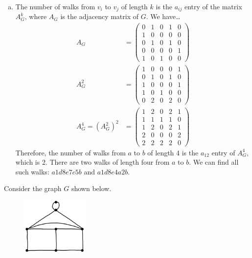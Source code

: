 \documentclass[11pt,letterpaper]{article}
\begin{document}
\begin{enumerate}[(a)]
\item The number of walks from $v_i$ to $v_j$ of length $k$ is the $a_{ij}$ entry of the matrix $A_G^k$, where $A_G$ is the adjacency matrix of $G$. We have\dots
	\[
	\begin{aligned}
	A_G&= 
	\begin{pmatrix}
	0 & 1 & 0 & 1 & 0 \\
	1 & 0 & 0 & 0 & 0 \\
	0 & 1 & 0 & 1 & 0 \\
	0 & 0 & 0 & 0 & 1 \\
	1 & 0 & 1 & 0 & 0 
	\end{pmatrix} \\[0.3cm]
	A_G^2&= 
	\begin{pmatrix}
	1 & 0 & 0 & 0 & 1 \\
	0 & 1 & 0 & 1 & 0 \\
	1 & 0 & 0 & 0 & 1 \\
	1 & 0 & 1 & 0 & 0 \\
	0 & 2 & 0 & 2 & 0 
	\end{pmatrix} \\[0.3cm]
	A_G^4= (A_G^2)^2&= 
	\begin{pmatrix}
	1 & 2 & 0 & 2 & 1 \\
	1 & 1 & 1 & 1 & 0 \\
	1 & 2 & 0 & 2 & 1 \\
	2 & 0 & 0 & 0 & 2 \\
	2 & 2 & 2 & 2 & 0 
	\end{pmatrix}
	\end{aligned}
	\]
Therefore, the number of walks from $a$ to $b$ of length 4 is the $a_{12}$ entry of $A_G^4$, which is 2. There are two walks of length four from $a$ to $b$. We can find all such walks: $a1d8e7c5b$ and $a1d8e4a2b$.
\end{enumerate}



\newpage



 Consider the graph $G$ shown below.
	\begin{figure}[h]
	\centering
	\includegraphics[width=0.3\textwidth]{graph3.jpg}
	\end{figure}
\end{document}
